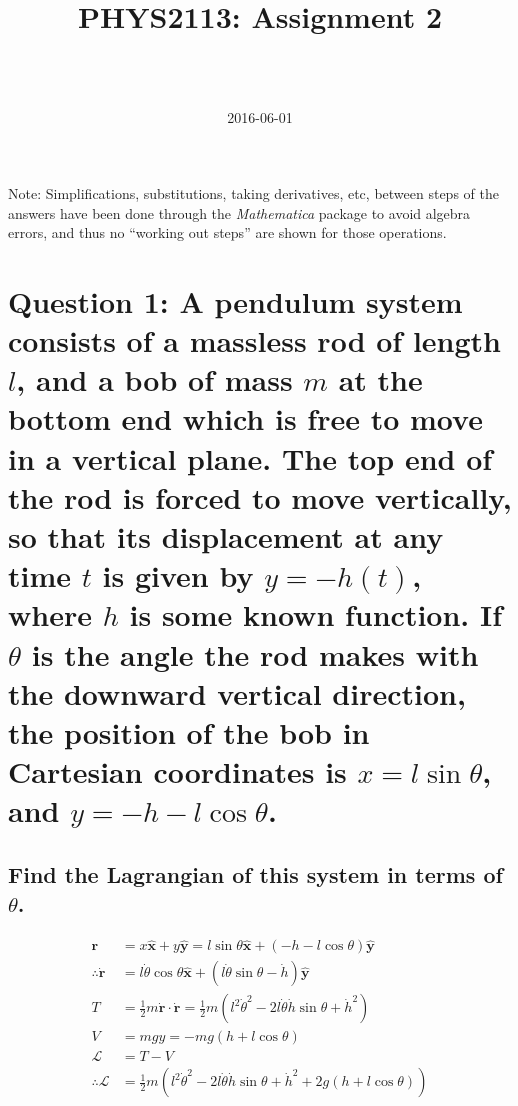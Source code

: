 \documentclass[a4paper]{scrartcl}
\begin{document}
\title{PHYS2113: Assignment 2}
\author{ \\ \\ }
\date{2016-06-01}
\maketitle

Note: Simplifications, substitutions, taking derivatives, etc, between steps of the answers have been done through the \emph{Mathematica} package to avoid algebra errors, and thus no ``working out steps'' are shown for those operations.

\section{Question 1: A pendulum system consists of a massless rod of length \(l\), and a bob of mass \(m\) at the bottom end which is free to move in a vertical plane. The top end of the rod is forced to move vertically, so that its displacement at any time \(t\) is given by \(y = -h(t)\), where \(h\) is some known function. If \(\theta\) is the angle the rod makes with the downward vertical direction, the position of the bob in Cartesian coordinates is \(x = l \sin \theta\), and \(y = -h -l \cos \theta\).}
\subsection{Find the Lagrangian of this system in terms of \(\theta\).}
\begin{align*}
    \mathbf{r} &= x \mathbf{\hat{x}} + y \mathbf{\hat{y}} = l \sin \theta \mathbf{\hat{x}} + (-h - l \cos \theta) \mathbf{\hat{y}} \\
    \therefore \dot{\mathbf{r}} &= l \dot{\theta} \cos \theta \mathbf{\hat{x}} + \left(l \dot{\theta} \sin \theta - \dot{h}\right) \mathbf{\hat{y}} \\
    T &= \frac{1}{2} m \dot{\mathbf{r}} \cdot \dot{\mathbf{r}} = \frac{1}{2} m \left(l^2 \dot{\theta}^2 - 2 l \dot{\theta} \dot{h} \sin \theta + \dot{h}^2\right) \\
    V &= m g y = -m g (h + l \cos \theta) \\
    \mathcal{L} &= T - V \\
    \therefore \mathcal{L} &= \frac{1}{2} m \left(l^2 \dot{\theta}^2 - 2 l \dot{\theta} \dot{h} \sin \theta + \dot{h}^2 + 2 g (h + l \cos \theta)\right)
\end{align*}
\end{document}
